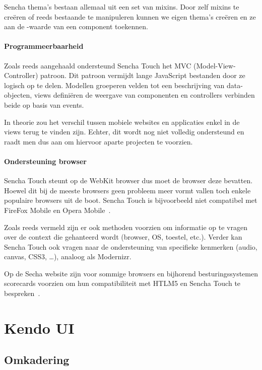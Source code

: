 Sencha thema's bestaan allemaal uit een set van mixins.  
Door zelf mixins te creëren of reeds bestaande te manipuleren kunnen we eigen thema's creëren en ze aan de -waarde van een component toekennen.

\paragraph{Programmeerbaarheid}
\label{sec:sencha-programeerbaarheid}
Zoals reeds aangehaald ondersteund Sencha Touch het MVC (Model-View-Controller) patroon.  
Dit patroon vermijdt lange JavaScript bestanden door ze logisch op te delen.  
Modellen groeperen velden tot een beschrijving van data-objecten,  views definiëren de weergave van componenten en controllers verbinden beide op basis van events.

In theorie zou het verschil tussen mobiele websites en applicaties enkel in de views terug te vinden zijn.  
Echter,  dit wordt nog niet volledig ondersteund en raadt men dus aan om hiervoor aparte projecten te voorzien.

\paragraph{Ondersteuning browser}
Sencha Touch steunt op de WebKit browser  dus moet de browser deze bevatten.  
Hoewel dit bij de meeste browsers geen probleem meer vormt vallen toch enkele populaire browsers uit de boot.  
Sencha Touch is bijvoorbeeld niet compatibel met FireFox Mobile en Opera Mobile~\cite{JohnEClark2012}.

Zoals reeds vermeld zijn er ook methoden voorzien om informatie op te vragen over de context die gehanteerd wordt (browser, OS, toestel, etc.).  Verder kan Sencha Touch ook vragen naar de ondersteuning van specifieke kenmerken (audio,  canvas,  CSS3, …),  analoog als Modernizr.  

Op de Secha website zijn voor sommige browsers en bijhorend besturingssystemen scorecards voorzien om hun compatibiliteit met HTLM5 en Sencha Touch te bespreken~\cite{Inc.}.


\section{Kendo UI}

\subsection{Omkadering}
